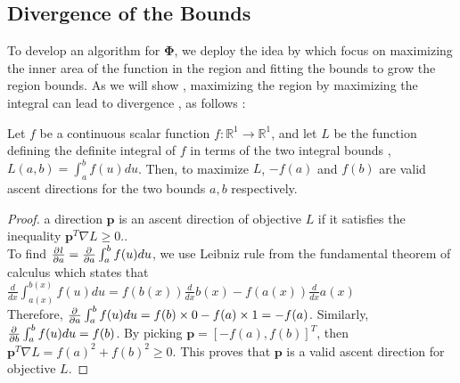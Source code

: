 \subsection{Divergence of the Bounds}
To develop an algorithm for $\mathbf{\Phi}$, we deploy the idea by \cite{ioc} which focus on maximizing the inner area of the function in the region and fitting the bounds to grow the region bounds. As we will show , maximizing the region by maximizing the integral can lead to divergence , as follows :
\begin{lemma} \label{thm:integral}
Let $f$ be a continuous scalar function $f: \mathbb{R}^{1} \rightarrow \mathbb{R}^{1} $, and let $L$ be the function defining the definite integral of $f$ in terms of the two integral bounds , \ie $L(a,b) = \int_{a}^{b}f(u)du$. Then, to maximize $L$, $-f(a)$ and $f(b)$ are valid ascent directions for the two bounds $a,b$ respectively. 
\end{lemma}
\begin{proof}
a direction $\mathbf{p}$ is an ascent direction of objective $L$ if it satisfies the inequality $\mathbf{p}^{T}\nabla L \geq 0$.\cite{Boyd}.\\ To find $\frac{\partial^{} l}{\partial a} =  \frac{\partial^{}  }{\partial a}\int_{a}^{b}f(u)du $, we use Leibniz rule from the fundamental theorem of calculus which states that $\frac { d } { d x } \int _ { a ( x ) } ^ { b ( x ) } f ( u ) d u = f ( b ( x ) ) \frac { d } { d x }b ( x ) - f ( a ( x ) )\frac { d } { d x } a ( x )$ \\
Therefore, $\frac{\partial^{}  }{\partial a}\int_{a}^{b}f(u)du = f ( b ) \times 0 - f ( a ) \times 1 = - f ( a )$. Similarly, $\frac{\partial^{}  }{\partial b}\int_{a}^{b}f(u)du = f ( b )$. By picking $\mathbf{p} = [-f(a), f(b)]^{T}$, then $\mathbf{p}^{T}\nabla L = f(a)^{2} + f(b)^{2} \geq 0$. This proves that $\mathbf{p}$ is a valid ascent direction for objective $L$. 
\end{proof}


